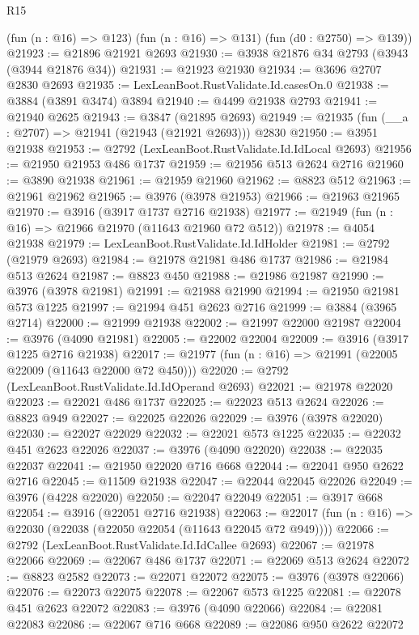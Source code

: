 \begin{lexlean}{R15}
\begin{coremodule}
      (fun (n : @16) => @123)
      (fun (n : @16) => @131)
      (fun (d0 : @2750) => @139))
@21923 := @21896 @21921 @2693
@21930 := @3938 @21876 @34 @2793 (@3943 (@3944 @21876 @34))
@21931 := @21923 @21930
@21934 := @3696 @2707 @2830 @2693
@21935 := LexLeanBoot.RustValidate.Id.casesOn.{0}
@21938 := @3884 (@3891 @3474) @3894
@21940 := @4499 @21938 @2793
@21941 := @21940 @2625
@21943 := @3847 (@21895 @2693)
@21949 := @21935 (fun (__a : @2707) => @21941 (@21943 (@21921 @2693))) @2830
@21950 := @3951 @21938
@21953 := @2792 (LexLeanBoot.RustValidate.Id.IdLocal @2693)
@21956 := @21950 @21953 @486 @1737
@21959 := @21956 @513 @2624 @2716
@21960 := @3890 @21938
@21961 := @21959 @21960
@21962 := @8823 @512
@21963 := @21961 @21962
@21965 := @3976 (@3978 @21953)
@21966 := @21963 @21965
@21970 := @3916 (@3917 @1737 @2716 @21938)
@21977 := @21949 (fun (n : @16) => @21966 @21970 (@11643 @21960 @72 @512))
@21978 := @4054 @21938
@21979 := LexLeanBoot.RustValidate.Id.IdHolder
@21981 := @2792 (@21979 @2693)
@21984 := @21978 @21981 @486 @1737
@21986 := @21984 @513 @2624
@21987 := @8823 @450
@21988 := @21986 @21987
@21990 := @3976 (@3978 @21981)
@21991 := @21988 @21990
@21994 := @21950 @21981 @573 @1225
@21997 := @21994 @451 @2623 @2716
@21999 := @3884 (@3965 @2714)
@22000 := @21999 @21938
@22002 := @21997 @22000 @21987
@22004 := @3976 (@4090 @21981)
@22005 := @22002 @22004
@22009 := @3916 (@3917 @1225 @2716 @21938)
@22017 := @21977 (fun (n : @16) => @21991 (@22005 @22009 (@11643 @22000 @72 @450)))
@22020 := @2792 (LexLeanBoot.RustValidate.Id.IdOperand @2693)
@22021 := @21978 @22020
@22023 := @22021 @486 @1737
@22025 := @22023 @513 @2624
@22026 := @8823 @949
@22027 := @22025 @22026
@22029 := @3976 (@3978 @22020)
@22030 := @22027 @22029
@22032 := @22021 @573 @1225
@22035 := @22032 @451 @2623 @22026
@22037 := @3976 (@4090 @22020)
@22038 := @22035 @22037
@22041 := @21950 @22020 @716 @668
@22044 := @22041 @950 @2622 @2716
@22045 := @11509 @21938
@22047 := @22044 @22045 @22026
@22049 := @3976 (@4228 @22020)
@22050 := @22047 @22049
@22051 := @3917 @668
@22054 := @3916 (@22051 @2716 @21938)
@22063 := @22017 (fun (n : @16) => @22030 (@22038 (@22050 @22054 (@11643 @22045 @72 @949))))
@22066 := @2792 (LexLeanBoot.RustValidate.Id.IdCallee @2693)
@22067 := @21978 @22066
@22069 := @22067 @486 @1737
@22071 := @22069 @513 @2624
@22072 := @8823 @2582
@22073 := @22071 @22072
@22075 := @3976 (@3978 @22066)
@22076 := @22073 @22075
@22078 := @22067 @573 @1225
@22081 := @22078 @451 @2623 @22072
@22083 := @3976 (@4090 @22066)
@22084 := @22081 @22083
@22086 := @22067 @716 @668
@22089 := @22086 @950 @2622 @22072

\end{coremodule}
\end{lexlean}
